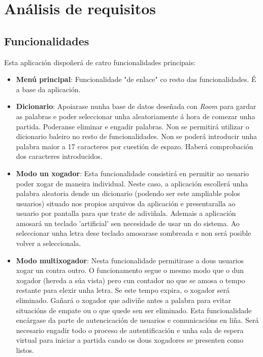 \chapter{Análisis de requisitos}
\label{chap:requisitos}
\section{Funcionalidades}
Esta aplicación dispoñerá de catro funcionalidades principais:
\begin{itemize}

    \item \textbf{Menú principal}: Funcionalidade "de enlace" co resto das funcionalidades. É a base da aplicación.
    
    \item \textbf{Dicionario}: Apoiarase nunha base de datos deseñada con \textit{Room} para gardar as palabras e poder seleccionar unha aleatoriamente á hora de comezar unha partida. Poderanse eliminar e engadir palabras. Non se permitirá utilizar o dicionario baleiro no resto de funcionalidades. Non se poderá introducir unha palabra maior a 17 caracteres por cuestión de espazo. Haberá comprobación dos caracteres introducidos.
    
    \item \textbf{Modo un xogador}: Esta funcionalidade consistirá en permitir ao usuario poder xogar de maneira individual. Neste caso, a aplicación escollerá unha palabra aleatoria dende un dicionario (podendo ser este ampliable polos usuarios) situado nos propios arquivos da aplicación e presentaralla ao usuario por pantalla para que trate de adiviñala. Ademais a aplicación amosará un teclado 'artificial' sen necesidade de usar un do sistema. Ao seleccionar unha letra dese teclado amosarase sombreada e non será posible volver a seleccionala.
    
    
    \item \textbf{Modo multixogador}: Nesta funcionalidade permitirase a dous usuarios xogar un contra outro. O funcionamento segue o mesmo modo que o dun xogador (hereda a súa vista) pero cun contador no que se amosa o tempo restante para elexir unha letra. Se este tempo expira, o xogador será eliminado. Gañará o xogador que adiviñe antes a palabra para evitar situacións de empate ou o que quede sen ser eliminado. Esta funcionalidade encárgase da parte de autencicación de usuarios e comunicacións en liña. Será necesario engadir todo o proceso de autentificación e unha sala de espera virtual para iniciar a partida cando os dous xogadores se presenten como listos.  \cite{mail-login} \cite{awesome-validation} \cite{mail-login2} \cite{firebase-loggin}
    
\end{itemize}
